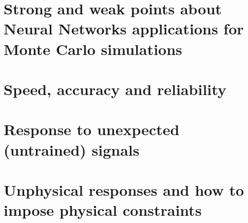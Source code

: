 \section{Strong and weak points about Neural Networks applications for Monte Carlo simulations}
\section{Speed, accuracy and reliability}
\section{Response to unexpected (untrained) signals}
\section{Unphysical responses and how to impose physical constraints}
